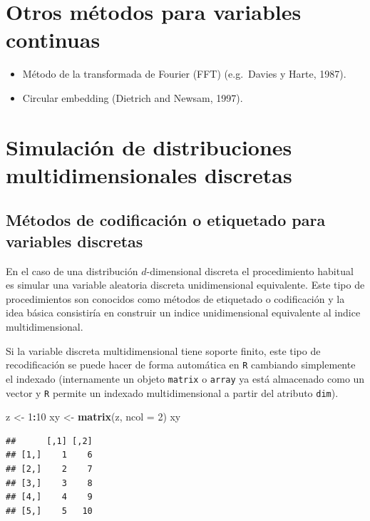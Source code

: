 \documentclass[]{book}
\newenvironment{Shaded}{\begin{snugshade}}{\end{snugshade}}
\newcommand{\KeywordTok}[1]{\textcolor[rgb]{0.13,0.29,0.53}{\textbf{#1}}}
\newcommand{\DataTypeTok}[1]{\textcolor[rgb]{0.13,0.29,0.53}{#1}}
\newcommand{\DecValTok}[1]{\textcolor[rgb]{0.00,0.00,0.81}{#1}}
\newcommand{\StringTok}[1]{\textcolor[rgb]{0.31,0.60,0.02}{#1}}
\newcommand{\OperatorTok}[1]{\textcolor[rgb]{0.81,0.36,0.00}{\textbf{#1}}}
\newcommand{\NormalTok}[1]{#1}
\theoremstyle{definition}
\theoremstyle{definition}
\theoremstyle{definition}
\theoremstyle{remark}
\begin{document}
\section{Otros métodos para variables
continuas}\label{otros-metodos-para-variables-continuas}

\begin{itemize}
\item
  Método de la transformada de Fourier (FFT) (e.g.~Davies y Harte,
  1987).
\item
  Circular embedding (Dietrich and Newsam, 1997).
\end{itemize}

\section{Simulación de distribuciones multidimensionales
discretas}\label{simulacion-de-distribuciones-multidimensionales-discretas}

\subsection{Métodos de codificación o etiquetado para variables
discretas}\label{metodos-de-codificacion-o-etiquetado-para-variables-discretas}

En el caso de una distribución \(d\)-dimensional discreta el
procedimiento habitual es simular una variable aleatoria discreta
unidimensional equivalente. Este tipo de procedimientos son conocidos
como métodos de etiquetado o codificación y la idea básica consistiría
en construir un indice unidimensional equivalente al indice
multidimensional.

Si la variable discreta multidimensional tiene soporte finito, este tipo
de recodificación se puede hacer de forma automática en \texttt{R}
cambiando simplemente el indexado (internamente un objeto
\texttt{matrix} o \texttt{array} ya está almacenado como un vector y
\texttt{R} permite un indexado multidimensional a partir del atributo
\texttt{dim}).

\begin{Shaded}
\begin{Highlighting}[]
\NormalTok{z <-}\StringTok{ }\DecValTok{1}\OperatorTok{:}\DecValTok{10}
\NormalTok{xy <-}\StringTok{ }\KeywordTok{matrix}\NormalTok{(z, }\DataTypeTok{ncol =} \DecValTok{2}\NormalTok{)}
\NormalTok{xy}
\end{Highlighting}
\end{Shaded}

\begin{verbatim}
##      [,1] [,2]
## [1,]    1    6
## [2,]    2    7
## [3,]    3    8
## [4,]    4    9
## [5,]    5   10
\end{verbatim}
\end{document}
